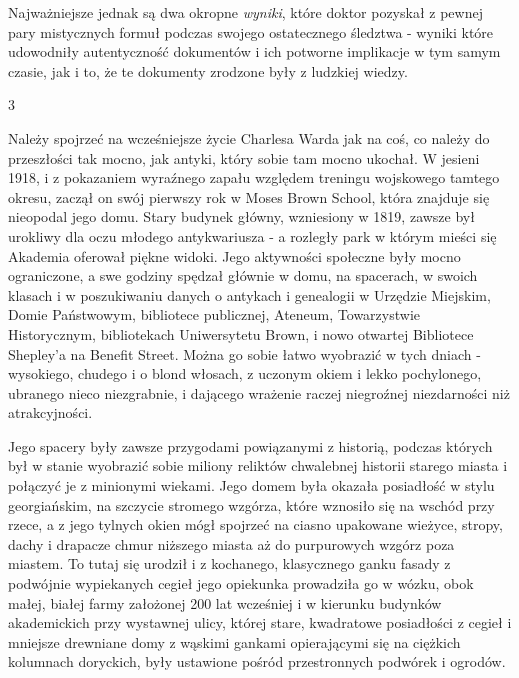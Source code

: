 Najważniejsze jednak są dwa okropne \textit{wyniki}, które doktor pozyskał z pewnej pary mistycznych formuł podczas swojego ostatecznego śledztwa - wyniki które udowodniły autentyczność dokumentów i ich potworne implikacje w tym samym czasie, jak i to, że te dokumenty zrodzone były z ludzkiej wiedzy.

\begin{center}
3
\end{center}

Należy spojrzeć na wcześniejsze życie Charlesa Warda jak na coś, co należy do przeszłości tak mocno, jak antyki, który sobie tam mocno ukochał. W jesieni 1918, i z pokazaniem wyraźnego zapału względem treningu wojskowego tamtego okresu, zaczął on swój pierwszy rok w Moses Brown School, która znajduje się nieopodal jego domu. Stary budynek główny, wzniesiony w 1819, zawsze był urokliwy dla oczu młodego antykwariusza - a rozległy park w którym mieści się Akademia oferował piękne widoki. Jego aktywności społeczne były mocno ograniczone, a swe godziny spędzał głównie w domu, na spacerach, w swoich klasach i w poszukiwaniu danych o antykach i genealogii w Urzędzie Miejskim, Domie Państwowym, bibliotece publicznej, Ateneum, Towarzystwie Historycznym, bibliotekach Uniwersytetu Brown, i nowo otwartej Bibliotece Shepley'a na Benefit Street. Można go sobie łatwo wyobrazić w tych dniach - wysokiego, chudego i o blond włosach, z uczonym okiem i lekko pochylonego, ubranego nieco niezgrabnie, i dającego wrażenie raczej niegroźnej niezdarności niż atrakcyjności. 

Jego spacery były zawsze przygodami powiązanymi z historią, podczas których był w stanie wyobrazić sobie miliony reliktów chwalebnej historii starego miasta i połączyć je z minionymi wiekami. Jego domem była okazała posiadłość w stylu georgiańskim, na szczycie stromego wzgórza, które wznosiło się na wschód przy rzece, a z jego tylnych okien mógł spojrzeć na ciasno upakowane wieżyce, stropy, dachy i drapacze chmur niższego miasta aż do purpurowych wzgórz poza miastem. To tutaj się urodził i z kochanego, klasycznego ganku fasady z podwójnie wypiekanych cegieł jego opiekunka prowadziła go w wózku, obok małej, białej farmy założonej 200 lat wcześniej i w kierunku budynków akademickich przy wystawnej ulicy, której stare, kwadratowe posiadłości z cegieł i mniejsze drewniane domy z wąskimi gankami opierającymi się na ciężkich kolumnach doryckich, były ustawione pośród przestronnych podwórek i ogrodów.

